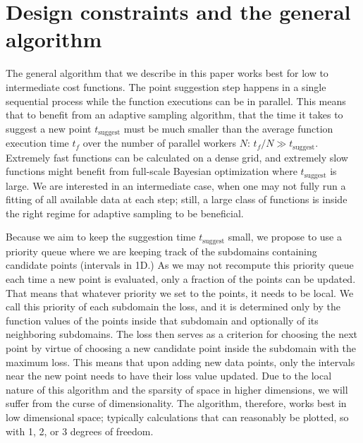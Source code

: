 \section{Design constraints and the general algorithm}


The general algorithm that we describe in this paper works best for low to intermediate cost functions.
The point suggestion step happens in a single sequential process while the function executions can be in parallel.
This means that to benefit from an adaptive sampling algorithm, that the time it takes to suggest a new point $t_\textrm{suggest}$ must be much smaller than the average function execution time $t_f$ over the number of parallel workers $N$: $t_f / N \gg t_\textrm{suggest}$.
Extremely fast functions can be calculated on a dense grid, and extremely slow functions might benefit from full-scale Bayesian optimization where $t_\textrm{suggest}$ is large.
We are interested in an intermediate case, when one may not fully run a fitting of all available data at each step; still, a large class of functions is inside the right regime for adaptive sampling to be beneficial.


Because we aim to keep the suggestion time $t_\textrm{suggest}$ small, we propose to use a priority queue where we are keeping track of the subdomains containing candidate points (intervals in 1D.)
As we may not recompute this priority queue each time a new point is evaluated, only a fraction of the points can be updated.
That means that whatever priority we set to the points, it needs to be local.
We call this priority of each subdomain the loss, and it is determined only by the function values of the points inside that subdomain and optionally of its neighboring subdomains.
The loss then serves as a criterion for choosing the next point by virtue of choosing a new candidate point inside the subdomain with the maximum loss.
This means that upon adding new data points, only the intervals near the new point needs to have their loss value updated.
Due to the local nature of this algorithm and the sparsity of space in higher dimensions, we will suffer from the curse of dimensionality.
The algorithm, therefore, works best in low dimensional space; typically calculations that can reasonably be plotted, so with 1, 2, or 3 degrees of freedom.

